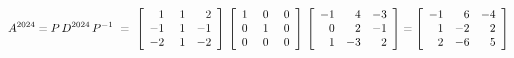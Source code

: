 \begin{solution}
$$A^{2024} = P\, D^{2024} \, P^{-1}\ =\ \left[ \begin{array}{rrr}
  1 & \ 1  &  2 \\
 -1 &   1  & -1 \\
 -2 &   1  & -2 \\
\end{array}\right] \\
\left[ \begin{array}{rrr}
  1 & \ 0  & \  0 \\
  0 &   1  &    0 \\
  0 &   0  &    0 \\
\end{array}\right] \\
\left[ \begin{array}{rrr}
 -1 &   4  & -3 \\
  0 &   2  & -1 \\
  1 &  -3  &  2 \\
\end{array}\right] = 
\left[\begin{array}{rrr}
 -1 &   6 & -4 \\
  1 &  -2 &  2 \\
  2 &  -6 &  5 \\
\end{array}\right]$$
\end{solution}

